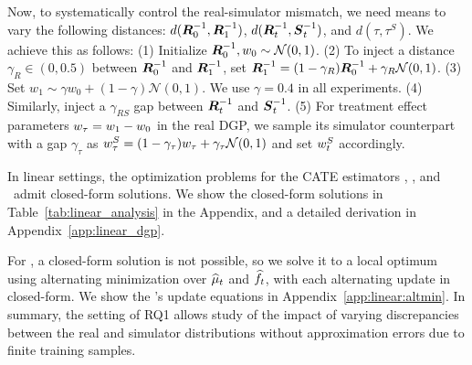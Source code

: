 Now, to systematically control the real-simulator mismatch, we need means to vary the following distances: $d(\boldsymbol{R}_0^{-1}, \boldsymbol{R}_1^{-1})$, $d(\boldsymbol{R}_t^{-1}, \boldsymbol{S}_t^{-1})$, and $d(\tau, \tau^S)$. We achieve this as follows:
% 
(1) Initialize $\boldsymbol{R}_0^{-1}, w_{0} \sim \mathcal{N}(0, 1)$.
(2) To inject a distance $\gamma_{R} \in (0, 0.5)$ between $\boldsymbol{R}_0^{-1}$ and $\boldsymbol{R}_1^{-1}$, set $\boldsymbol{R}_1^{-1} = (1 - \gamma_{R}) \boldsymbol{R}_0^{-1} + \gamma_R \mathcal{N}(0, 1)$.
(3) Set $w_1 \sim \gamma w_0 + (1 - \gamma) \mathcal{N}(0, 1)$. We use $\gamma=0.4$ in all experiments.
(4) Similarly, inject a $\gamma_{RS}$ gap between $\boldsymbol{R}_t^{-1}$ and $\boldsymbol{S}_t^{-1}$.
(5) For treatment effect parameters $w_\tau = w_1 - w_0$ in the real DGP, we sample its simulator counterpart with a gap $\gamma_\tau$ as $w_\tau^S = (1 - \gamma_\tau) w_\tau + \gamma_\tau \mathcal{N}(0, 1)$ and set $w_{t}^S$ accordingly. 


In  linear settings, the optimization problems for the CATE estimators \simonly, \realonly, and \muonly\ admit closed-form solutions. We show the closed-form solutions in Table~\ref{tab:linear_analysis} in the Appendix, and a detailed derivation in Appendix~\ref{app:linear_dgp}.






For \our, a closed-form solution is not possible, so we solve it to a local optimum using alternating minimization over $\widehat{\mu}_t$ and $\widehat{f}_t$, with each alternating update in closed-form. We show the \our's update equations in Appendix~\ref{app:linear:altmin}. In summary, the setting of RQ1 allows study of the impact of varying discrepancies between the real and simulator distributions without approximation errors due to finite training samples.


